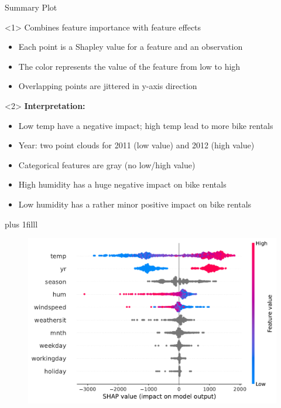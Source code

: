 \documentclass[10pt,compress,t,notes=noshow, xcolor=table]{beamer}
\newcommand{\btVFill}{\vskip0pt plus 1filll}
\begin{document}
\begin{frame}{Summary Plot}
\begin{onlyenv}<1>
Combines feature importance with feature effects
\begin{itemize}
    \item Each point is a Shapley value for a feature and an observation
    \item The color represents the value of the feature from low to high
    \item Overlapping points are jittered in y-axis direction
\end{itemize}
\end{onlyenv}

\begin{onlyenv}<2>
\textbf{Interpretation:}\\
\begin{itemize}
    \item Low temp have a negative impact; high temp lead to more bike rentals
    \item Year: two point clouds for 2011 (low value) and 2012 (high value)\\
    \item Categorical features are gray (no low/high value)
    \item High humidity has a huge negative impact on bike rentals
    \item Low humidity has a rather minor positive impact on bike rentals
\end{itemize}
 
\end{onlyenv}

\btVFill

\begin{figure}
    \centering
    \includegraphics[width=0.5\columnwidth]{figure_man/global_shap_jitter.pdf}
    
\end{figure}
\end{frame} 

\end{document}

